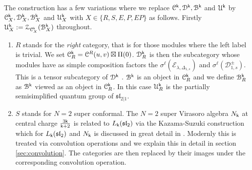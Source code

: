 \documentclass[a4paper, reqno]{amsart}
\theoremstyle{introTheorems}
\newcommand\cB{\mathcal{B}}
\newcommand\cC{\mathcal{C}}
\newcommand\cD{\mathcal{D}}
\newcommand\cU{\mathcal{U}}
\newcommand\cZ{\mathcal{Z}}
\renewcommand\sl{\mathfrak{sl}}
\renewcommand{\1}{\mathbbold{1}}
\begin{document}
The construction has a few variations where we replace $\cC^\k, \cD^\k, \cB^\k$ and $\cU^\k$ by $\cC^\k_X, \cD^\k_X, \cB^\k_X$ and $\cU^\k_X$ with $X \in \{R, S, E, P, EP\}$ as follows. Firstly
$\cU^\k_X:=\cZ_{\cC^\k_X}(\cB^\k_X)$ throughout. 
\begin{enumerate}
    \item[(R)] $R$ stands for the \emph{right} category, that is for those modules where the left label is trivial.  We set $\cC^\k_R = \cC^R(u,v)\boxtimes \Pi(0)$. $\cD^\k_R$ is then the subcategory whose modules have as simple composition factors the  $\sigma^\ell(\mathcal{E}_{\lambda,\Delta_{1,s}})$ and $\sigma^\ell(\mathcal{D}^\pm_{1,s})$. This is a tensor subcategory of $\cD^\k$ \cite[Corollary 8.5]{Cr24}. $\cB^\k$ is an object in $\cC^\k_R$ and we define $\cB^\k_R$ as $\cB^\k$ viewed as an object in $\cC^\k_R$. In this case $\cU^\k_R$ is the partially semisimplified quantum group of $\mathfrak{sl}_{2|1}$.
    \item[(S)] $S$ stands for $N=2$ super conformal. The $N=2$ super Virasoro algebra $N_{\mathsf{k}}$ at central charge $\frac{3\mathsf{k}}{\mathsf{k}+2}$ is related to $L_\k(\sl_2)$ via the Kazama-Suzuki construction \cite{KS89} which for $L_\k(\sl_2)$ and $N_{\mathsf{k}}$ is discussed in great detail in \cites{CR3, NORW24}. Modernly this is treated via convolution operations and we explain this in detail in section \ref{sec:convolution}. The categories are then replaced by their images under the corresponding convolution operation. 


\end{enumerate}
\end{document}
